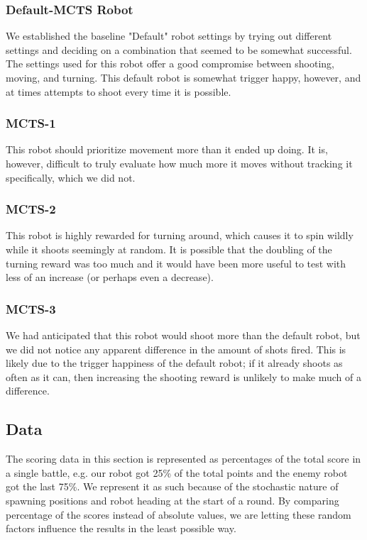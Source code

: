 \subsubsection{Default-MCTS Robot}
We established the baseline "Default" robot settings by trying out different settings and deciding on a combination that seemed to be somewhat successful. The settings used for this robot offer a good compromise between shooting, moving, and turning. This default robot is somewhat trigger happy, however, and at times attempts to shoot every time it is possible.

\subsubsection{MCTS-1}
This robot should prioritize movement more than it ended up doing. It is, however, difficult to truly evaluate how much more it moves without tracking it specifically, which we did not. 

\subsubsection{MCTS-2} 
This robot is highly rewarded for turning around, which causes it to spin wildly while it shoots seemingly at random. It is possible that the doubling of the turning reward was too much and it would have been more useful to test with less of an increase (or perhaps even a decrease).

\subsubsection{MCTS-3}
We had anticipated that this robot would shoot more than the default robot, but we did not notice any apparent difference in the amount of shots fired. This is likely due to the trigger happiness of the default robot; if it already shoots as often as it can, then increasing the shooting reward is unlikely to make much of a difference.

\subsection{Data}
The scoring data in this section is represented as percentages of the total score in a single battle, e.g. our robot got 25\% of the total points and the enemy robot got the last 75\%. We represent it as such because of the stochastic nature of spawning positions and robot heading at the start of a round. By comparing percentage of the scores instead of absolute values, we are letting these random factors influence the results in the least possible way.

